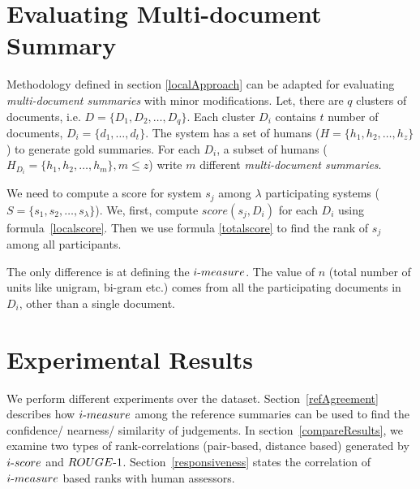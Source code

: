 \documentclass[a4paper]{report}
\begin{document}
\section{Evaluating Multi-document Summary}

Methodology defined in section \ref{localApproach} can be adapted for evaluating \emph{multi-document summaries} with minor modifications. Let, there are $q$ clusters of documents, i.e. $ D = \{D_1,D_2,\dots,D_q\}$. Each cluster $D_i$ contains $t$ number of documents, $D_i =\{d_1,\dots,d_t\}$. The system has a set of humans ($H = \{h_1,h_2,\dots,h_z\}$) to generate gold summaries. For each $D_i$, a subset of humans ($H_{D_i} = \{h_1,h_2,\dots,h_m\}, m \le z$) write $m$ different \emph{multi-document summaries}. 
\par We need to compute a score for system $s_j$ among $\lambda$ participating systems ($S = \{s_1,s_2,\dots,s_\lambda\}$). We, first, compute $score(s_j, D_i)$ for each $D_i$ using formula~\ref{localscore}. Then we use formula \ref{totalscore} to find the rank of $s_j$ among all participants.
\par The only difference is at defining the $i\hbox{-}measure$. The value of $n$ (total number of units like unigram, bi-gram etc.) comes from all the participating documents in $D_i$, other than a single document.
\section{Experimental Results}

We perform different experiments over the dataset. Section~\ref{refAgreement} describes how $i\hbox{-}measure$ among the reference summaries can be used to find the confidence/ nearness/ similarity of judgements. 
In section~\ref{compareResults}, we examine two types of rank-correlations (pair-based, distance based) generated by $i\hbox{-}score$ and $ROUGE\hbox{-}1$. Section~\ref{responsiveness} states the correlation of $i\hbox{-}measure$ based ranks with human assessors.
\end{document}
